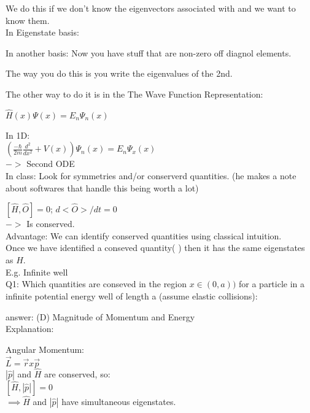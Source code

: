 \documentclass{article}
\begin{document}
We do this if we don't know the eigenvectors associated with  and we want
to know them.\\

In Eigenstate basis:


In another basis:
Now you have stuff that are non-zero off diagnol elements.

The way you do this is you write the eigenvalues of the 2nd.

The other way to do it is in the The Wave Function Representation:

$\hat{H}(x)\Psi(x) = E_{n}\Psi_{n}(x)$

In 1D:\\

$\left(\frac{-\hbar}{2m}\frac{d^2}{dx^2} + V(x)\right)\Psi_{n}(x) = E_{n}\Psi_{x}(x)$\\

$->$ Second ODE\\
In class: Look for symmetries and/or conserverd quantities.
(he makes a note about softwares that handle this being worth a lot)



\implies $[\hat{H}, \hat{O}] = 0$; $d<\hat{O}>/dt = 0$\\
$->$ Is conserved.\\

Advantage: We can identify conserved quantities using classical intuition.\\

Once we have identified a conseved quantity( ) then it has the same
eigenstates as $\hat{H}$.\\

E.g. Infinite well\\

Q1: Which quantities are conseved in the region $x\in(0,a))$ for a particle
in a infinite potential energy well of length a (assume elastic collisions):

answer: (D) Magnitude of Momentum and Energy\\

Explanation:

Angular Momentum:\\
$\vec{L} = \vec{r} x \vec{p}$\\

$|\hat{p}|$ and $\hat{H}$ are conserved, so:\\
$[\hat{H}, |\hat{p}|] = 0$\\
$\implies \hat{H}$ and $|\hat{p}|$ have simultaneous eigenstates.\\
\end{document}
